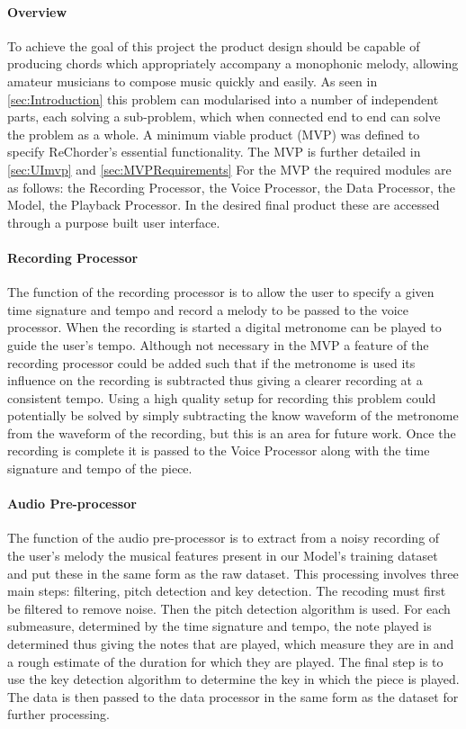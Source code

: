 \paragraph{Overview}
To achieve the goal of this project the product design should be capable of producing chords which appropriately accompany a monophonic melody, allowing amateur musicians to compose music quickly and easily.
As seen in \cref{sec:Introduction} this problem can modularised into a number of independent parts, each solving a sub-problem, which when connected end to end can solve the problem as a whole.
A minimum viable product (MVP) was defined to specify ReChorder's essential functionality.
The MVP is further detailed in \cref{sec:UImvp} and \cref{sec:MVPRequirements}
For the MVP the required modules are as follows: the Recording Processor, the Voice Processor, the Data Processor, the Model, the Playback Processor.
In the desired final product these are accessed through a purpose built user interface.

\paragraph{Recording Processor}

The function of the recording processor is to allow the user to specify a given time signature and tempo and record a melody to be passed to the voice processor.
When the recording is started a digital metronome can be played to guide the user's tempo. 
Although not necessary in the MVP a feature of the recording processor could be added such that if the metronome is used its influence on the recording is subtracted thus giving a clearer recording at a consistent tempo.
Using a high quality setup for recording this problem could potentially be solved by simply subtracting the know waveform of the metronome from the waveform of the recording, but this is an area for future work.
Once the recording is complete it is passed to the Voice Processor along with the time signature and tempo of the piece.

\paragraph{Audio Pre-processor}

The function of the audio pre-processor is to extract from a noisy recording of the user's melody the musical features present in our Model's training dataset and put these in the same form as the raw dataset.
This processing involves three main steps: filtering, pitch detection and key detection.
The recoding must first be filtered to remove noise.
Then the pitch detection algorithm is used.
For each submeasure, determined by the time signature and tempo, the note played is determined thus giving the notes that are played, which measure they are in and a rough estimate of the duration for which they are played.
The final step is to use the key detection algorithm to determine the key in which the piece is played.
The data is then passed to the data processor in the same form as the dataset for further processing.

